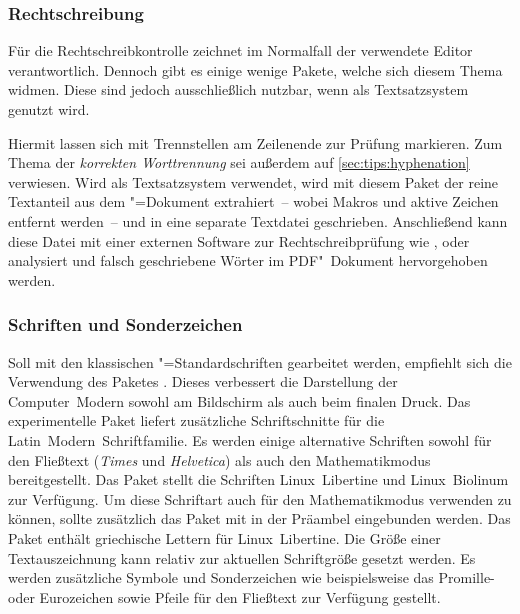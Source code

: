 \subsubsection{%
  Rechtschreibung%
}
%
Für die Rechtschreibkontrolle zeichnet im Normalfall der verwendete Editor 
verantwortlich. Dennoch gibt es einige wenige Pakete, welche sich diesem Thema 
widmen. Diese sind jedoch ausschließlich nutzbar, wenn als Textsatzsystem 
 genutzt wird.

\begin{DeclarePackages}
  Hiermit lassen sich mit  Trennstellen am Zeilenende zur 
  Prüfung markieren. Zum Thema der \textit{korrekten Worttrennung} sei außerdem 
  auf \autoref{sec:tips:hyphenation} verwiesen.
  Wird  als Textsatzsystem verwendet, wird mit diesem Paket 
  der reine Textanteil aus dem "=Dokument extrahiert~-- wobei 
  Makros und aktive Zeichen entfernt werden~-- und in eine separate Textdatei 
  geschrieben. Anschließend kann diese Datei mit einer externen Software zur  
  Rechtschreibprüfung wie ,  oder 
   analysiert und falsch geschriebene Wörter im 
  PDF"~Dokument hervorgehoben werden.
\end{DeclarePackages}
%



\subsubsection{Schriften und Sonderzeichen}
%
\begin{DeclarePackages}
  Soll mit den klassischen "=Standardschriften gearbeitet werden, 
  empfiehlt sich die Verwendung des Paketes . Dieses 
  verbessert die Darstellung der Computer~Modern sowohl am Bildschirm als auch 
  beim finalen Druck. Das experimentelle Paket  liefert 
  zusätzliche Schriftschnitte für die Latin~Modern~Schriftfamilie.
  Es werden einige alternative Schriften sowohl für den Fließtext 
  (\textit{Times} und \textit{Helvetica}) als auch den Mathematikmodus 
  bereitgestellt.
  Das Paket stellt die Schriften Linux~Libertine und Linux~Biolinum zur 
  Verfügung. Um diese Schriftart auch für den Mathematikmodus verwenden zu 
  können, sollte zusätzlich das Paket  mit 
   in der 
  Präambel eingebunden werden. Das Paket  enthält griechische 
  Lettern für Linux~Libertine.
  Die Größe einer Textauszeichnung kann relativ zur aktuellen Schriftgröße 
  gesetzt werden.
  Es werden zusätzliche Symbole und Sonderzeichen wie beispielsweise das 
  Promille- oder Eurozeichen sowie Pfeile für den Fließtext zur Verfügung 
  gestellt.
\end{DeclarePackages}

